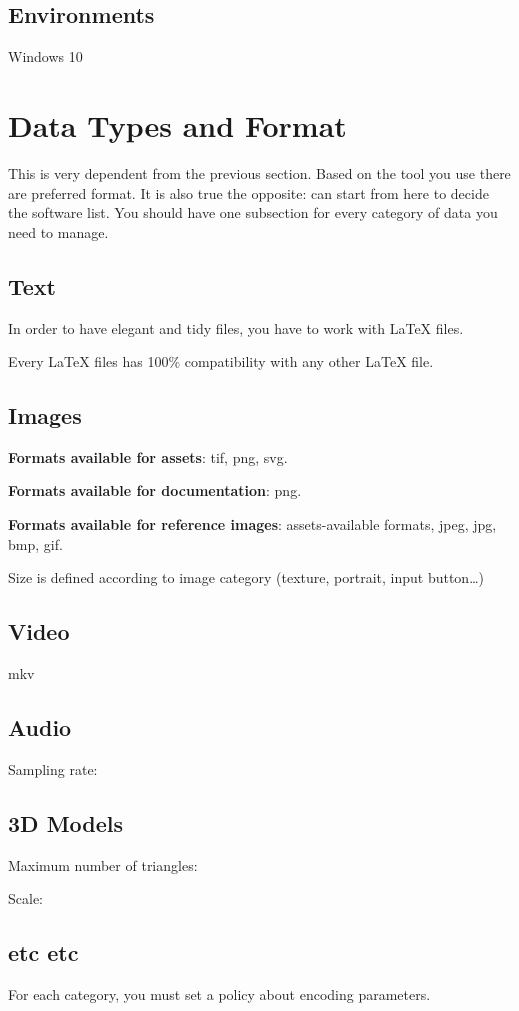 \documentclass[12pt]{article}
\begin{document}
\subsection{Environments}
Windows 10

\section{Data Types and Format}
This is very dependent from the previous section. Based on the tool you use there are preferred format. It is also true the opposite: can start from here to decide the software list.
You should have one subsection for every category of data you need to manage. 

\subsection{Text}
In order to have elegant and tidy files, you have to work with LaTeX files.

Every LaTeX files has 100\% compatibility with any other LaTeX file.

\subsection{Images}
\textbf{Formats available for assets}: tif, png, svg.

\textbf{Formats available for documentation}: png.

\textbf{Formats available for reference images}: assets-available formats, jpeg, jpg, bmp, gif.

Size is defined according to image category (texture, portrait, input button…)

\subsection{Video}
mkv

\subsection{Audio}
Sampling rate:

\subsection{3D Models}
Maximum number of triangles:

Scale: 

\subsection{etc etc}
For each category, you must set a policy about encoding parameters.
\end{document}
